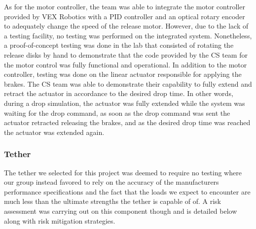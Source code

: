 As for the motor controller, the team was able to integrate the motor controller provided by VEX Robotics with a PID controller and an optical rotary encoder to adequately change the speed of the release motor. However, due to the lack of a testing facility, no testing was performed on the integrated system. Nonetheless, a proof-of-concept testing was done in the lab that consisted of rotating the release disks by hand to demonstrate that the code provided by the CS team for the motor control was fully functional and operational. In addition to the motor controller, testing was done on the linear actuator responsible for applying the brakes. The CS team was able to demonstrate their capability to fully extend and retract the actuator in accordance to the desired drop time. In other words, during a drop simulation, the actuator was fully extended while the system was waiting for the drop command, as soon as the drop command was sent the actuator retracted releasing the brakes, and as the desired drop time was reached the actuator was extended again.

\subsubsection{Tether}

\indent\indent The tether we selected for this project was deemed to require no testing where our group instead favored to rely on the accuracy of the manufacturers performance specifications and the fact that the loads we expect to encounter are much less than the ultimate strengths the tether is capable of of. A risk assessment was carrying out on this component though and is detailed below along with risk mitigation strategies. 

